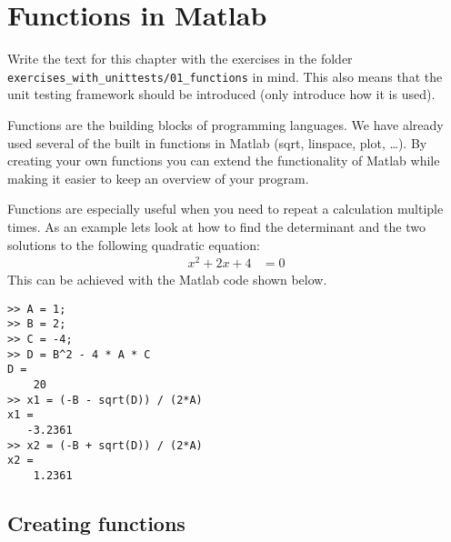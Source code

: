 \section{Functions in Matlab}


Write the text for this chapter with the exercises in the folder
\verb!exercises_with_unittests/01_functions! in mind.
This also means that the unit testing framework should be introduced (only introduce how it is used).

Functions are the building blocks of programming languages.
We have already used several of the built in functions 
in Matlab (sqrt, linspace, plot, \ldots). 
By creating your own functions you can extend the functionality of 
Matlab while making it easier to keep an overview of your program.

Functions are especially useful when you need to repeat a calculation 
multiple times.
As an example lets look at how to find the determinant and the two solutions 
to the following quadratic equation: 
\begin{align*}
x^2 + 2x + 4 &= 0 
\end{align*}
This can be achieved with the Matlab code shown below.
\begin{verbatim}
>> A = 1; 
>> B = 2; 
>> C = -4;
>> D = B^2 - 4 * A * C
D =
    20
>> x1 = (-B - sqrt(D)) / (2*A)
x1 =
   -3.2361
>> x2 = (-B + sqrt(D)) / (2*A)
x2 =
    1.2361
\end{verbatim}



\subsection{Creating functions}


